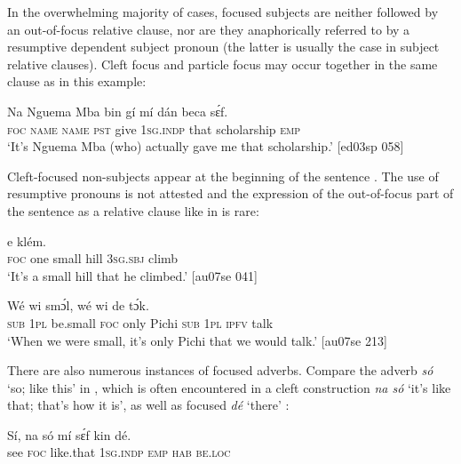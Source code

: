 In the overwhelming majority of cases, focused subjects are neither followed by an out-of-focus relative clause, nor are they anaphorically referred to by a resumptive dependent subject pronoun (the latter is usually the case in subject relative clauses). Cleft focus and particle focus may occur together in the same clause as in this example: 



\ea%
    \label{ex:key:701}
    \gll Na  Nguema  Mba    bin  gí  mí    dán    beca      sɛ́f.\\
\textsc{foc}  \textsc{name}  \textsc{name}  \textsc{pst}  give  \textsc{1sg.indp}  that    scholarship  \textsc{emp}\\

\glt \textsc{‘}It’s Nguema Mba (who) actually gave me that scholarship.’ [ed03sp 058]
\z

Cleft-focused non-subjects appear at the beginning of the sentence . The use of resumptive pronouns is not attested and the expression of the out-of-focus part of the sentence as a relative clause like in  is rare: 


\ea%
    \label{ex:key:702}
    \gll {}          e    klém.\\
\textsc{foc}  one    small  hill  \textsc{3sg.sbj}  climb\\

\glt ‘It’s a small hill that he climbed.’ [au07se 041]
\z


\ea%
    \label{ex:key:703}
    \gll Wé  wi  smɔ́l,          wé  wi  de  tɔ́k.\\
\textsc{sub}  \textsc{1pl}  be.small  \textsc{foc}  only    Pichi  \textsc{sub}  \textsc{1pl}  \textsc{ipfv}  talk\\

\glt ‘When we were small, it’s only Pichi that we would talk.’ [au07se 213]
\z

There are also numerous instances of focused adverbs. Compare the adverb \textit{só} ‘so; like this’ in , which is often encountered in a cleft construction \textit{na só} ‘it’s like that; that’s how it is’, as well as focused \textit{dé} ‘there’ : 


\ea%
    \label{ex:key:704}
    \gll Sí,  na  só    mí    sɛ́f  kin  dé.\\
see  \textsc{foc}  like.that  \textsc{1sg.indp}  \textsc{emp}  \textsc{hab}  \textsc{be.loc}\\

